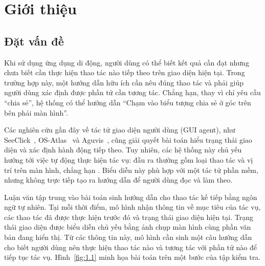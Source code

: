 \chapter{Giới thiệu}
\label{chap:1}

\section{Đặt vấn đề}\label{sec:1.1}

Khi sử dụng ứng dụng di động, người dùng có thể biết kết quả cần đạt nhưng chưa biết cần thực hiện thao tác nào tiếp theo trên giao diện hiện tại. Trong trường hợp này, một hướng dẫn hữu ích cần nêu đúng thao tác và phải giúp người dùng xác định được phần tử cần tương tác. Chẳng hạn, thay vì chỉ yêu cầu “chia sẻ”, hệ thống có thể hướng dẫn “Chạm vào biểu tượng chia sẻ ở góc trên bên phải màn hình”.

Các nghiên cứu gần đây về tác tử giao diện người dùng (GUI agent), như SeeClick~\cite{seeclick}, OS-Atlas~\cite{osatlas} và Aguvis~\cite{aguvis}, cũng giải quyết bài toán hiểu trạng thái giao diện và xác định hành động tiếp theo. Tuy nhiên, các hệ thống này chủ yếu hướng tới việc tự động thực hiện tác vụ: đầu ra thường gồm loại thao tác và vị trí trên màn hình, chẳng hạn . Biểu diễn này phù hợp với một tác tử phần mềm, nhưng không trực tiếp tạo ra hướng dẫn để người dùng đọc và làm theo.

Luận văn tập trung vào bài toán sinh hướng dẫn cho thao tác kế tiếp bằng ngôn ngữ tự nhiên. Tại mỗi thời điểm, mô hình nhận thông tin về mục tiêu của tác vụ, các thao tác đã được thực hiện trước đó và trạng thái giao diện hiện tại. Trạng thái giao diện được biểu diễn chủ yếu bằng ảnh chụp màn hình cùng phần văn bản đang hiển thị. Từ các thông tin này, mô hình cần sinh một câu hướng dẫn cho biết người dùng nên thực hiện thao tác nào và tương tác với phần tử nào để tiếp tục tác vụ. Hình~\ref{fig:1.1} minh họa bài toán trên một bước của tập kiểm tra.

